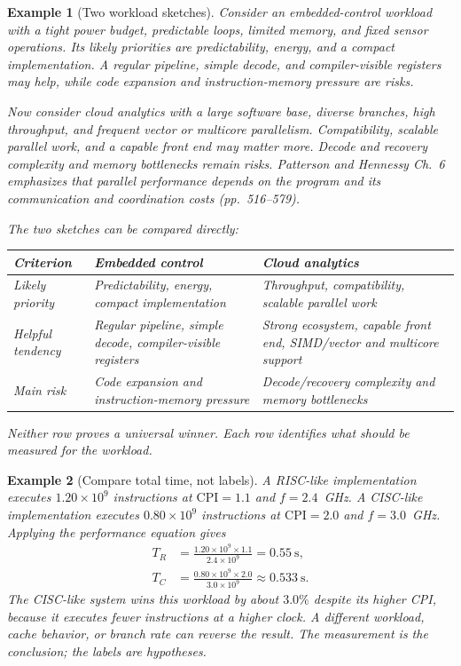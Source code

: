 \documentclass[11pt]{article}
\newtheorem{example}{Example}[section]
\begin{document}
\begin{example}[Two workload sketches]
Consider an embedded-control workload with a tight power budget, predictable
loops, limited memory, and fixed sensor operations. Its likely priorities are
predictability, energy, and a compact implementation. A regular pipeline,
simple decode, and compiler-visible registers may help, while code expansion
and instruction-memory pressure are risks.

Now consider cloud analytics with a large software base, diverse branches,
high throughput, and frequent vector or multicore parallelism. Compatibility,
scalable parallel work, and a capable front end may matter more. Decode and
recovery complexity and memory bottlenecks remain risks. Patterson and
Hennessy Ch.~6 emphasizes that parallel performance depends on the program and
its communication and coordination costs (pp.~516--579).

The two sketches can be compared directly:
\begin{center}
\scriptsize
\begin{tabular}{@{}>{\raggedright\arraybackslash}p{3.0cm}>{\raggedright\arraybackslash}p{4.0cm}>{\raggedright\arraybackslash}p{4.0cm}@{}}
\toprule
\textbf{Criterion} & \textbf{Embedded control} & \textbf{Cloud analytics}\\
\midrule
Likely priority & Predictability, energy, compact implementation & Throughput, compatibility, scalable parallel work\\
Helpful tendency & Regular pipeline, simple decode, compiler-visible registers & Strong ecosystem, capable front end, SIMD/vector and multicore support\\
Main risk & Code expansion and instruction-memory pressure & Decode/recovery complexity and memory bottlenecks\\
\bottomrule
\end{tabular}
\end{center}

Neither row proves a universal winner. Each row identifies what should be
measured for the workload.
\end{example}

\begin{example}[Compare total time, not labels]
A RISC-like implementation executes $1.20\times10^9$ instructions at
$\mathrm{CPI}=1.1$ and $f=2.4$~GHz. A CISC-like implementation executes
$0.80\times10^9$ instructions at $\mathrm{CPI}=2.0$ and $f=3.0$~GHz. Applying
the performance equation gives
\begin{align*}
  T_R &= \frac{1.20\times10^9\times1.1}{2.4\times10^9}
       =0.55~\text{s},\\
  T_C &= \frac{0.80\times10^9\times2.0}{3.0\times10^9}
       \approx0.533~\text{s}.
\end{align*}
The CISC-like system wins this workload by about $3.0\%$ despite its higher
CPI, because it executes fewer instructions at a higher clock. A different
workload, cache behavior, or branch rate can reverse the result. The
measurement is the conclusion; the labels are hypotheses.
\end{example}
\end{document}
